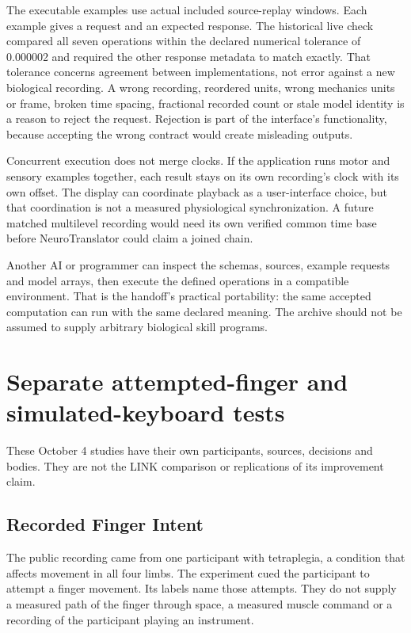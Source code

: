 The executable examples use actual included source-replay windows. Each example gives a request and an expected response. The historical live check compared all seven operations within the declared numerical tolerance of 0.000002 and required the other response metadata to match exactly. That tolerance concerns agreement between implementations, not error against a new biological recording. A wrong recording, reordered units, wrong mechanics units or frame, broken time spacing, fractional recorded count or stale model identity is a reason to reject the request. Rejection is part of the interface's functionality, because accepting the wrong contract would create misleading outputs.

Concurrent execution does not merge clocks. If the application runs motor and sensory examples together, each result stays on its own recording's clock with its own offset. The display can coordinate playback as a user-interface choice, but that coordination is not a measured physiological synchronization. A future matched multilevel recording would need its own verified common time base before NeuroTranslator could claim a joined chain.

Another AI or programmer can inspect the schemas, sources, example requests and model arrays, then execute the defined operations in a compatible environment. That is the handoff's practical portability: the same accepted computation can run with the same declared meaning. The archive should not be assumed to supply arbitrary biological skill programs.

\section{Separate attempted-finger and simulated-keyboard tests}

These October 4 studies have their own participants, sources, decisions and bodies. They are not the LINK comparison or replications of its improvement claim.

\subsection{Recorded Finger Intent}

The public recording came from one participant with tetraplegia, a condition
that affects movement in all four limbs. The experiment cued the participant to
attempt a finger movement. Its labels name those attempts. They do not supply a
measured path of the finger through space, a measured muscle command or a
recording of the participant playing an instrument.

